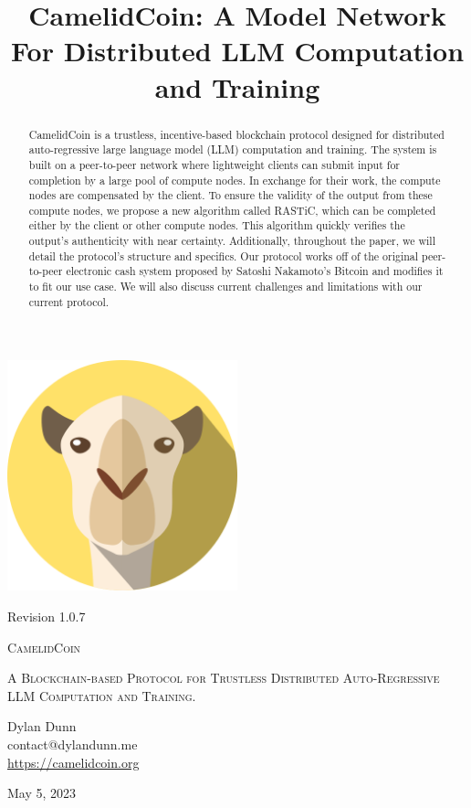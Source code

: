 \documentclass{article}
\title{CamelidCoin: A Model Network For Distributed LLM Computation and Training}
\begin{document}

\begin{titlepage}
    \centering
    \includegraphics[width=0.5\textwidth]{logoLarge.png}\par\vspace{.5cm}
    {\small Revision 1.0.7 \\}
    \vspace{1cm}
    {\fontsize{24.88}{48}\selectfont\scshape CamelidCoin\par}
    \vspace{1cm}
    {\scshape\Large A Blockchain-based Protocol for Trustless Distributed Auto-Regressive LLM Computation and Training. \par}
    \vspace{2cm}
    {\Large Dylan Dunn \\}
    {\Large contact@dylandunn.me \\}
    \vspace{1cm}
    \url{https://camelidcoin.org}
    \vspace{0.5cm}
    \vfill
    {\large May 5, 2023\par}
  \end{titlepage}

\begin{abstract}
CamelidCoin is a trustless, incentive-based blockchain protocol designed for distributed auto-regressive large language model (LLM) computation and training. 
The system is built on a peer-to-peer network where lightweight clients can submit input for completion by a large pool of compute nodes. 
In exchange for their work, the compute nodes are compensated by the client. 
To ensure the validity of the output from these compute nodes, we propose a new algorithm called \ac{RASTiC}, which can be completed either by the client or other compute nodes. 
This algorithm quickly verifies the output's authenticity with near certainty. 
Additionally, throughout the paper, we will detail the protocol's structure and specifics.
Our protocol works off of the original peer-to-peer electronic cash system proposed by Satoshi Nakamoto's Bitcoin and modifies it to fit our use case. 
We will also discuss current challenges and limitations with our current protocol.
\end{abstract}
\end{document}
